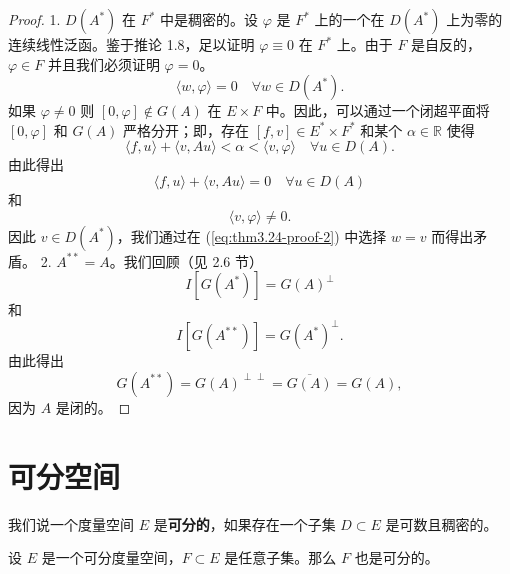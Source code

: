 \begin{proof}
1. $D(A^*)$ 在 $F^*$ 中是稠密的。设 $\varphi$ 是 $F^*$ 上的一个在 $D(A^*)$ 上为零的连续线性泛函。鉴于推论 1.8，足以证明 $\varphi \equiv 0$ 在 $F^*$ 上。由于 $F$ 是自反的，$\varphi \in F$ 并且我们必须证明 $\varphi=0$。
\begin{equation}\label{eq:thm3.24-proof-2}
\langle w, \varphi \rangle = 0 \quad \forall w \in D(A^*).
\end{equation}
如果 $\varphi \neq 0$ 则 $[0, \varphi] \notin G(A)$ 在 $E \times F$ 中。因此，可以通过一个闭超平面将 $[0, \varphi]$ 和 $G(A)$ 严格分开；即，存在 $[f, v] \in E^* \times F^*$ 和某个 $\alpha \in \mathbb{R}$ 使得
\[ \langle f, u \rangle + \langle v, Au \rangle < \alpha < \langle v, \varphi \rangle \quad \forall u \in D(A). \]
由此得出
\[ \langle f, u \rangle + \langle v, Au \rangle = 0 \quad \forall u \in D(A) \]
和
\[ \langle v, \varphi \rangle \neq 0. \]
因此 $v \in D(A^*)$，我们通过在 (\ref{eq:thm3.24-proof-2}) 中选择 $w=v$ 而得出矛盾。
2. $A^{**} = A$。我们回顾（见 2.6 节）
\[ I[G(A^*)] = G(A)^\perp \]
和
\[ I[G(A^{**})] = G(A^*)^\perp. \]
由此得出
\[ G(A^{**}) = G(A)^{\perp\perp} = \overline{G(A)} = G(A), \]
因为 $A$ 是闭的。
\end{proof}

\section{可分空间}
\begin{definition}
我们说一个度量空间 $E$ 是\textbf{可分的}，如果存在一个子集 $D \subset E$ 是可数且稠密的。
\end{definition}

\begin{proposition}\label{prop3.25}
设 $E$ 是一个可分度量空间，$F \subset E$ 是任意子集。那么 $F$ 也是可分的。
\end{proposition}

